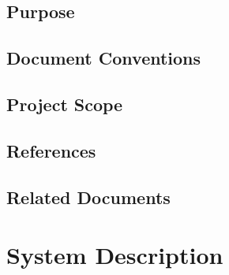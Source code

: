 \documentclass[12pt]{article}
\begin{document}
	\subsection{Purpose}


	\subsection{Document Conventions}


	\subsection{Project Scope}


	\subsection{References}


	\subsection{Related Documents}



\section{System Description}
\end{document}
